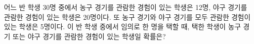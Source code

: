 어느 반 학생 30명 중에서 농구 경기를 관람한 경험이 있는 학생은 12명, 야구 경기를 관람한 경험이 있는 학생은 20명이다. 또 농구 경기와 야구 경기를 모두 관람한 경험이 있는 학생은 5명이다. 이 반 학생 중에서 임의로 한 명을 택할 때, 택한 학생이 농구 경기 또는 야구 경기를 관람한 경험이 있는 학생일 확률은?
